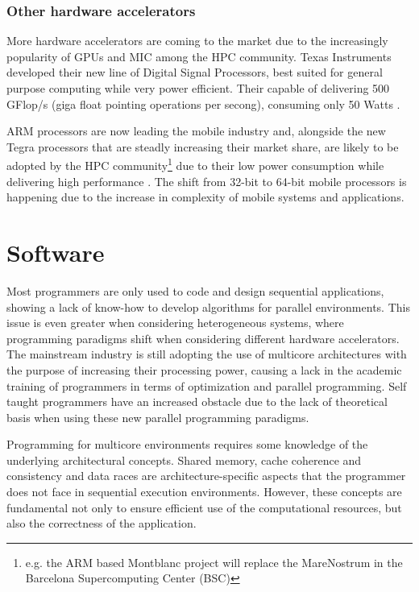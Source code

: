 \subsubsection*{Other hardware accelerators}
\label{OtherAccelerators}

More hardware accelerators are coming to the market due to the increasingly popularity of GPUs and \intel MIC among the HPC community. Texas Instruments developed their new line of Digital Signal Processors, best suited for general purpose computing while very power efficient. Their capable of delivering 500 GFlop/s (giga float pointing operations per secong), consuming only 50 Watts \cite{Texas:DSP}.

ARM processors are now leading the mobile industry and, alongside the new \nvidia Tegra processors \cite{NVIDIA:Tegra} that are steadly increasing their market share, are likely to be adopted by the HPC community\footnote{e.g. the ARM based Montblanc project will replace the MareNostrum in the Barcelona Supercomputing Center (BSC)} due to their low power consumption while delivering high performance \cite{ARM}. The shift from 32-bit to 64-bit mobile processors is happening due to the increase in complexity of mobile systems and applications.

\section{Software}
\label{Software}

Most programmers are only used to code and design sequential applications, showing a lack of know-how to develop algorithms for parallel environments. This issue is even greater when considering heterogeneous systems, where programming paradigms shift when considering different hardware accelerators. The mainstream industry is still adopting the use of multicore architectures with the purpose of increasing their processing power, causing a lack in the academic training of programmers in terms of optimization and parallel programming. Self taught programmers have an increased obstacle due to the lack of theoretical basis when using these new parallel programming paradigms.

Programming for multicore environments requires some knowledge of the underlying architectural concepts. Shared memory, cache coherence and consistency and data races are architecture-specific aspects that the programmer does not face in sequential execution environments. However, these concepts are fundamental not only to ensure efficient use of the computational resources, but also the correctness of the application.

